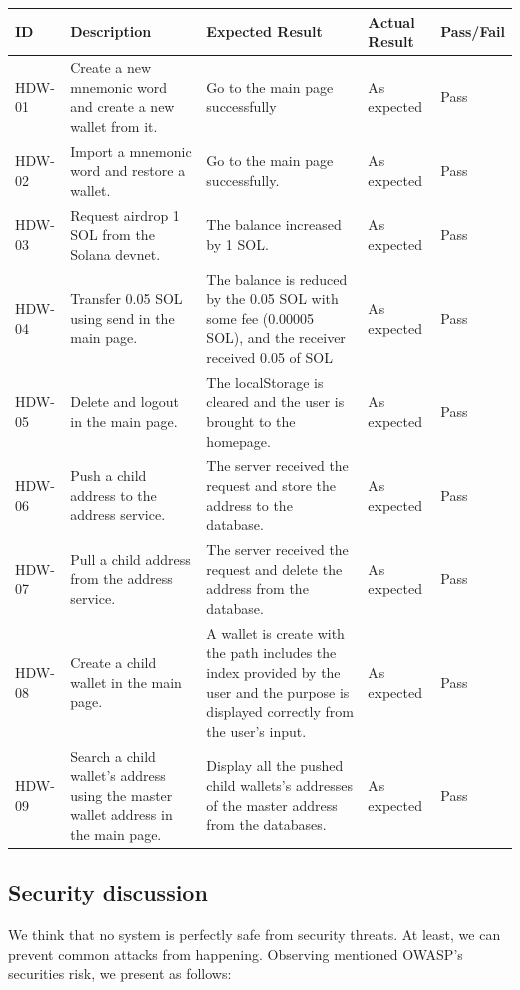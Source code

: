 \begin{tabular}{ m{1.5cm} m{4.5cm} m{5cm} m{3cm} m{1.5cm}}
    \toprule
    ID & Description & Expected Result & Actual Result & Pass/Fail                                            \\ 
    \midrule
    HDW-01 & Create a new mnemonic word and create a new wallet from it. & Go to the main page successfully & As expected & Pass \\ 
    HDW-02 & Import a mnemonic word and restore a wallet.  &  Go to the main page successfully. & As expected & Pass  \\ 
    HDW-03 & Request airdrop 1 SOL from the Solana devnet. &  The balance increased by 1 SOL. & As expected & Pass    \\ 
    HDW-04 & Transfer 0.05 SOL using send in the main page. &  The balance is reduced by the 0.05 SOL with some fee (0.00005 SOL), and the receiver received 0.05 of SOL & As expected & Pass   \\ 
    HDW-05 & Delete and logout in the main page. &  The localStorage is cleared and the user is brought to the homepage. & As expected & Pass   \\ 
    HDW-06 & Push a child address to the address service.&  The server received the request and store the address to the database. & As expected & Pass   \\ 
    HDW-07 & Pull a child address from the address service.&  The server received the request and delete the address from the database. & As expected & Pass   \\ 
    HDW-08 & Create a child wallet in the main page.&  A wallet is create with the path includes the index provided by the user and the purpose is displayed correctly from the user's input. & As expected & Pass   \\ 
    HDW-09 & Search a child wallet's address using the master wallet address in the main page.& Display all the pushed child wallets's addresses of the master address from the databases. & As expected & Pass   \\ 
    \bottomrule
\end{tabular}
\subsection{Security discussion}

We think that no system is perfectly safe from security threats. At least, we can prevent common attacks from happening. Observing mentioned OWASP’s securities risk, we present as follows:

